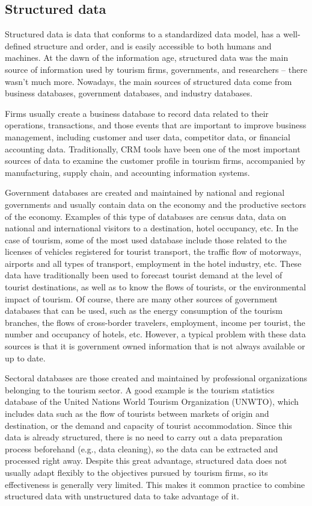\documentclass[
  letterpaper,
  DIV=11,
  numbers=noendperiod]{scrreprt}
\begin{document}
\hypertarget{structured-data}{%
\subsection{Structured data}\label{structured-data}}

Structured data is data that conforms to a standardized data model, has
a well-defined structure and order, and is easily accessible to both
humans and machines. At the dawn of the information age, structured data
was the main source of information used by tourism firms, governments,
and researchers -- there wasn't much more. Nowadays, the main sources of
structured data come from business databases, government databases, and
industry databases.

Firms usually create a business database to record data related to their
operations, transactions, and those events that are important to improve
business management, including customer and user data, competitor data,
or financial accounting data. Traditionally, CRM tools have been one of
the most important sources of data to examine the customer profile in
tourism firms, accompanied by manufacturing, supply chain, and
accounting information systems.

Government databases are created and maintained by national and regional
governments and usually contain data on the economy and the productive
sectors of the economy. Examples of this type of databases are census
data, data on national and international visitors to a destination,
hotel occupancy, etc. In the case of tourism, some of the most used
database include those related to the licenses of vehicles registered
for tourist transport, the traffic flow of motorways, airports and all
types of transport, employment in the hotel industry, etc. These data
have traditionally been used to forecast tourist demand at the level of
tourist destinations, as well as to know the flows of tourists, or the
environmental impact of tourism. Of course, there are many other sources
of government databases that can be used, such as the energy consumption
of the tourism branches, the flows of cross-border travelers,
employment, income per tourist, the number and occupancy of hotels, etc.
However, a typical problem with these data sources is that it is
government owned information that is not always available or up to date.

Sectoral databases are those created and maintained by professional
organizations belonging to the tourism sector. A good example is the
tourism statistics database of the United Nations World Tourism
Organization (UNWTO), which includes data such as the flow of tourists
between markets of origin and destination, or the demand and capacity of
tourist accommodation. Since this data is already structured, there is
no need to carry out a data preparation process beforehand (e.g., data
cleaning), so the data can be extracted and processed right away.
Despite this great advantage, structured data does not usually adapt
flexibly to the objectives pursued by tourism firms, so its
effectiveness is generally very limited. This makes it common practice
to combine structured data with unstructured data to take advantage of
it.
\end{document}
